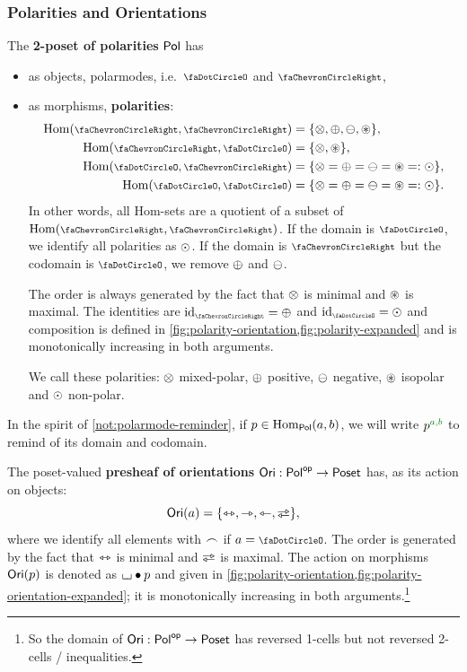 \documentclass[a4paper]{memoir}
\begin{document}
\subsubsection{Polarities and Orientations}
\begin{definition} \label{def:polarity-cat}
	The \textbf{2-poset of polarities} ${\mathsf{Pol}}$ has
	\begin{itemize}
		\item as objects, polarmodes, i.e.\ $\npolar$ and $\ypolar$,
		\item as morphisms, \textbf{polarities}:
		\begin{align*}
			\Hom(\ypolar, \ypolar) &= \accol{\mixpol, \pospol, \negpol, \isopol}, \\
			\Hom(\ypolar, \npolar) &= \accol{\mixpol, \isopol}, \\
			\Hom(\npolar, \ypolar) &= \accol{\mixpol = \pospol = \negpol = \isopol =: \nonpol}, \\
			\Hom(\npolar, \npolar) &= \accol{\mixpol = \pospol = \negpol = \isopol =: \nonpol}.
		\end{align*}
		In other words, all Hom-sets are a quotient of a subset of $\Hom(\ypolar, \ypolar)$.
		If the domain is $\npolar$, we identify all polarities as ${\odot}$.
		If the domain is $\ypolar$ but the codomain is $\npolar$, we remove ${\oplus}$ and ${\ominus}$.
		
		The order is always generated by the fact that ${\otimes}$ is minimal and ${\oast}$ is maximal.
		The identities are $\id_\ypolar = \pospol$ and $\id_\npolar = \nonpol$ and composition is defined in \cref{fig:polarity-orientation,fig:polarity-expanded} and is monotonically increasing in both arguments.
		
		We call these polarities: ${\otimes}$ mixed-polar, ${\oplus}$ positive, ${\ominus}$ negative, ${\oast}$ isopolar and ${\odot}$ non-polar.
	\end{itemize}
\end{definition}
\begin{notation} \label{not:polarmode-reminder-polarity}
	In the spirit of \cref{not:polarmode-reminder},
	if $p \in {\mathrm{Hom}}_{\mathsf{Pol}}(a, b)$, we will write $p \pmrhom a b$ to remind of its domain and codomain.
\end{notation}
\begin{definition} \label{def:orientation-psh}
	The poset-valued \textbf{presheaf of orientations} ${\mathsf{Ori}} : {\mathsf{Pol}}^{\mathsf{op}} \to {\mathsf{Poset}}$ has, as its action on objects:
	\[
		\oripsh(a) = \accol{\equijetsym, \jetsym, \tejsym, \infrajetsym},
	\]
	where we identify all elements with ${\frown}$ if $a = \npolar$.
	The order is generated by the fact that ${\leftrightarrowtriangle}$ is minimal and $\infrajetsym$ is maximal.
	The action on morphisms ${\mathsf{Ori}}(p)$ is denoted as ${\llcorner\hspace{-.4ex}\lrcorner} \mathbin{\bullet} p$ and given in \cref{fig:polarity-orientation,fig:polarity-orientation-expanded}; it is monotonically increasing in both arguments.\footnote{So the domain of ${\mathsf{Ori}} : {\mathsf{Pol}}^{\mathsf{op}} \to {\mathsf{Poset}}$ has reversed 1-cells but not reversed 2-cells / inequalities.}
\end{definition}
\end{document}
